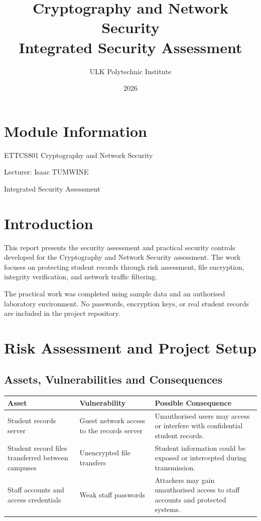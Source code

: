 \documentclass[12pt,a4paper]{article}
\title{Cryptography and Network Security\\Integrated Security Assessment}
\author{ULK Polytechnic Institute}
\date{2026}
\begin{document}
\maketitle

\section*{Module Information}

\begin{center}
ETTCS801 Cryptography and Network Security

\vspace{0.3cm}

Lecturer: Isaac TUMWINE

\vspace{0.3cm}

Integrated Security Assessment
\end{center}

\section{Introduction}

This report presents the security assessment and practical security controls developed for the Cryptography and Network Security assessment. The work focuses on protecting student records through risk assessment, file encryption, integrity verification, and network traffic filtering.

The practical work was completed using sample data and an authorised laboratory environment. No passwords, encryption keys, or real student records are included in the project repository.

\section{Risk Assessment and Project Setup}

\subsection{Assets, Vulnerabilities and Consequences}

\begin{center}
\begin{tabular}{|p{3cm}|p{4cm}|p{6cm}|}
\hline
\textbf{Asset} & \textbf{Vulnerability} & \textbf{Possible Consequence} \\
\hline
Student records server &
Guest network access to the records server &
Unauthorised users may access or interfere with confidential student records. \\
\hline
Student record files transferred between campuses &
Unencrypted file transfers &
Student information could be exposed or intercepted during transmission. \\
\hline
Staff accounts and access credentials &
Weak staff passwords &
Attackers may gain unauthorised access to staff accounts and protected systems. \\
\hline
\end{tabular}
\end{center}
\end{document}
